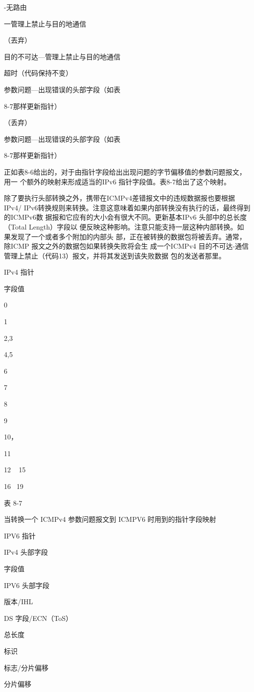 -无路由

一管理上禁止与目的地通信

（丟弃）

目的不可达—管理上禁止与目的地通信

超时（代码保持不变）

参数问题—出现错误的头部字段（如表

8-7那样更新指针）

（丢弃）

参数问题—出现错误的头部字段（如表

8-7那样更新指针）

正如表8-6给出的，对于由指针字段给出出现问题的字节偏移值的参数问题报文，用一
个额外的映射来形成适当的IPv6 指针字段值。表8-7给出了这个映射。

除了要执行头部转换之外，携带在ICMPv4差错报文中的违规数据报也要根据IPv4/
IPv6转换规则来转换。注意这意味着如果内部转换没有执行的话，最终得到的ICMPv6数
据报和它应有的大小会有很大不同。更新基本IPv6 头部中的总长度（Total Length）字段以
便反映这种影响。注意只能支持一层这种内部转换。如果发现了一个或者多个附加的内部头
部，正在被转换的数据包将被丢弃。通常，除ICMP 报文之外的数据包如果转换失败将会生
成一个ICMPv4 目的不可达-通信管理上禁止（代码13）报文，并将其发送到该失败数据
包的发送者那里。

IPv4 指针

字段值

0

1

2,3

4,5

6

7

8

9

10，

11

12 ~ 15

16~ 19

表 8-7

当转换一个 ICMPv4 参数问题报文到 ICMPV6 时用到的指针字段映射

IPV6 指针

IPv4 头部字段

字段值

IPV6 头部字段

版本/IHL

DS 字段/ECN（ToS）

总长度

标识

标志/分片偏移

分片偏移

